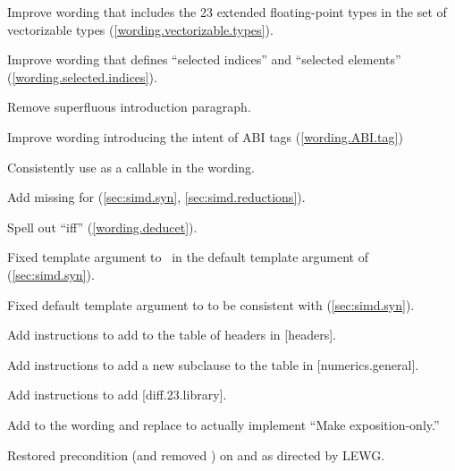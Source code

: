 \begin{revision}
\item Improve wording that includes the \CC{}23 extended floating-point types in the set of vectorizable types (\ref{wording.vectorizable.types}).
\item Improve wording that defines “selected indices” and “selected elements” (\ref{wording.selected.indices}).
\item Remove superfluous introduction paragraph.
\item Improve wording introducing the intent of ABI tags (\ref{wording.ABI.tag})
\item Consistently use  as a callable in the wording.
\item Add missing  for  (\ref{sec:simd.syn}, \ref{sec:simd.reductions}).
\item Spell out “iff” (\ref{wording.deducet}).
\item Fixed template argument to \nativeabi\ in the default template argument of  (\ref{sec:simd.syn}).
\item Fixed default template argument to  to be consistent with  (\ref{sec:simd.syn}).
\item Add instructions to add  to the table of headers in [headers].
\item Add instructions to add a new subclause to the table in [numerics.general].
\item Add instructions to add  [diff.23.library].
\item Add \simdsizev to the wording and replace  to actually implement “Make  exposition-only.”
\item Restored precondition (and removed ) on
   and  as directed by LEWG.
\end{revision}

